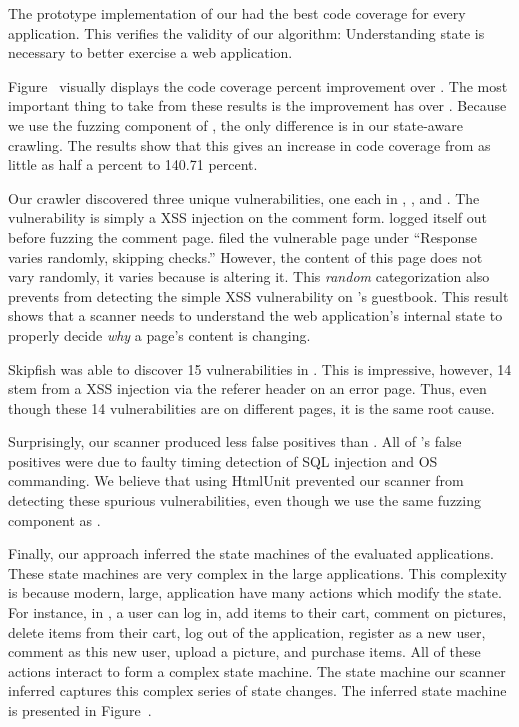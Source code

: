 The prototype implementation of our \crawler{} had the best code coverage for
every application. This verifies the validity of our algorithm: Understanding
state is necessary to better exercise a web application.

Figure~ visually displays the code coverage percent
improvement over \wget{}. The most important thing to take from these results
is the improvement \crawler{} has over \waf{}. Because we use the fuzzing
component of \waf{}, the only difference is in our state-aware crawling. The
results show that this gives \crawler{} an increase in code coverage from as
little as half a percent to 140.71 percent.

Our crawler discovered three unique vulnerabilities, one each in \phpbbtwo{},
\scarf{}, and \wackopicko{}. The \scarf{} vulnerability is simply a XSS injection
on the comment form. \waf{} logged itself out before fuzzing the comment page.
\skipfish{} filed the vulnerable page under ``Response varies
randomly, skipping checks.'' However, the content of this page does not vary
randomly, it varies because \skipfish{} is altering it. This \emph{random} categorization also prevents
\skipfish{} from detecting the simple XSS vulnerability on \wackopicko{}'s
guestbook. This result shows that a scanner needs to understand the web application's
internal state to properly decide \emph{why} a page's content is changing. 

Skipfish was able to discover 15 vulnerabilities in \vanillaforums{}. This is
impressive, however, 14 stem from a XSS injection via the referer header on an
error page. Thus, even though these 14 vulnerabilities are on different pages,
it is the same root cause. 

Surprisingly, our scanner produced less false positives than \waf{}. All of
\waf{}'s false positives were due to faulty timing detection of SQL injection
and OS commanding. We believe that using HtmlUnit prevented our scanner from
detecting these spurious vulnerabilities, even though we use the same fuzzing
component as \waf{}.

Finally, our approach inferred the state machines of the evaluated
applications. These state machines are very complex in the large applications.
This complexity is because modern, large, application have many actions which modify the
state. For instance, in \wackopicko{}, a user can log in, add items to their
cart, comment on pictures, delete items from their cart, log out of the
application, register as a new user, comment as this new user, upload a
picture, and purchase items. All of these actions interact to form a complex
state machine. The state machine our scanner inferred captures this complex
series of state changes. The inferred \wackopicko{} state machine is presented
in Figure~.

